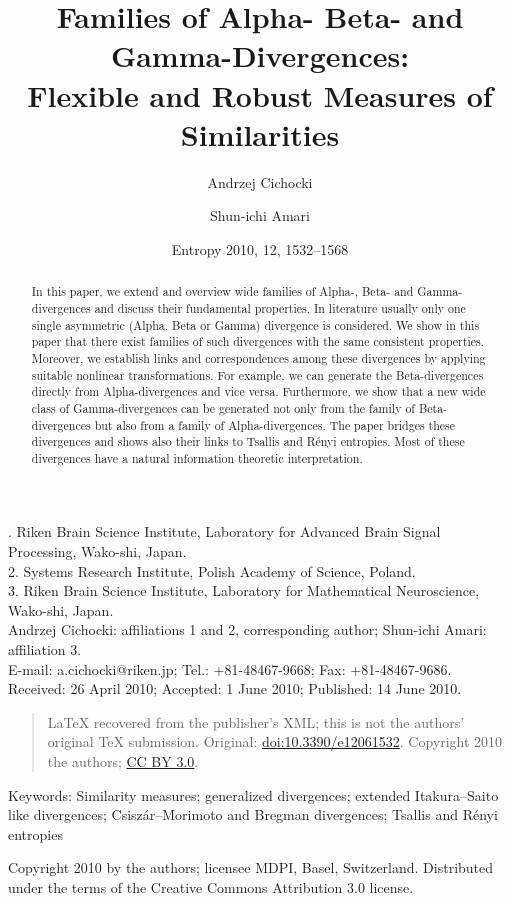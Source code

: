 \documentclass[11pt,a4paper]{article}
\title{Families of Alpha- Beta- and Gamma-Divergences:\\Flexible and Robust Measures of Similarities}
\author{Andrzej Cichocki \and Shun-ichi Amari}
\date{Entropy 2010, 12, 1532--1568}
\begin{document}
\maketitle
{\small{}. Riken Brain Science Institute, Laboratory for Advanced Brain Signal Processing, Wako-shi, Japan.\\2. Systems Research Institute, Polish Academy of Science, Poland.\\3. Riken Brain Science Institute, Laboratory for Mathematical Neuroscience, Wako-shi, Japan.\\Andrzej Cichocki: affiliations 1 and 2, corresponding author; Shun-ichi Amari: affiliation 3.\\E-mail: a.cichocki@riken.jp; Tel.: +81-48467-9668; Fax: +81-48467-9686.\\Received: 26 April 2010; Accepted: 1 June 2010; Published: 14 June 2010.\par}
\begin{quote}\small LaTeX recovered from the publisher's XML; this is not the authors' original TeX submission. Original: \href{https://doi.org/10.3390/e12061532}{doi:10.3390/e12061532}. Copyright 2010 the authors; \href{https://creativecommons.org/licenses/by/3.0/}{CC BY 3.0}.\end{quote}
\begin{abstract}
In this paper, we extend and overview wide families of Alpha-, Beta- and Gamma-divergences and discuss their fundamental properties. In literature usually only one single asymmetric (Alpha, Beta or Gamma) divergence is considered. We show in this paper that there exist families of such divergences with the same consistent properties. Moreover, we establish links and correspondences among these divergences by applying suitable nonlinear transformations. For example, we can generate the Beta-divergences directly from Alpha-divergences and vice versa. Furthermore, we show that a new wide class of Gamma-divergences can be generated not only from the family of Beta-divergences but also from a family of Alpha-divergences. The paper bridges these divergences and shows also their links to Tsallis and Rényi entropies. Most of these divergences have a natural information theoretic interpretation.
\end{abstract}
\noindent Keywords: Similarity measures; generalized divergences; extended Itakura--Saito like divergences; Csiszár--Morimoto and Bregman divergences; Tsallis and Rényi entropies
\tableofcontents
\clearpage






\appendix




\bigskip\noindent\small Copyright 2010 by the authors; licensee MDPI, Basel, Switzerland. Distributed under the terms of the Creative Commons Attribution 3.0 license.
\end{document}
